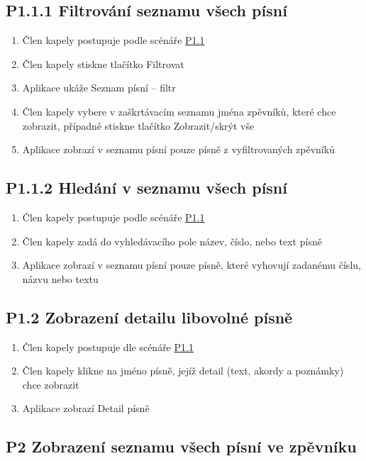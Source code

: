 \subsection{P1.1.1 Filtrování seznamu všech písní}
\label{P1.1.1}

\begin{enumerate}
    \item Člen kapely postupuje podle scénáře \hyperref[P1.1]{P1.1}
    \item Člen kapely stiskne tlačítko Filtrovat
    \item Aplikace ukáže Seznam písní -- filtr
    \item Člen kapely vybere v zaškrtávacím seznamu jména zpěvníků, které chce zobrazit, případně stiskne tlačítko Zobrazit/skrýt vše
    \item Aplikace zobrazí v seznamu písní pouze písně z vyfiltrovaných zpěvníků
\end{enumerate}

\subsection{P1.1.2 Hledání v seznamu všech písní}
\label{P1.1.2}

\begin{enumerate}
    \item Člen kapely postupuje podle scénáře \hyperref[P1.1]{P1.1}
    \item Člen kapely zadá do vyhledávacího pole název, číslo, nebo text písně
    \item Aplikace zobrazí v seznamu písní pouze písně, které vyhovují zadanému číslu, názvu nebo textu
\end{enumerate}

\subsection{P1.2 Zobrazení detailu libovolné písně}

\begin{enumerate}
    \item Člen kapely postupuje dle scénáře \hyperref[P1.1]{P1.1}
    \item Člen kapely klikne na jméno písně, jejíž detail (text, akordy a poznámky) chce zobrazit
    \item Aplikace zobrazí Detail písně
\end{enumerate}

\subsection{P2 Zobrazení seznamu všech písní ve zpěvníku}
\label{P2}

